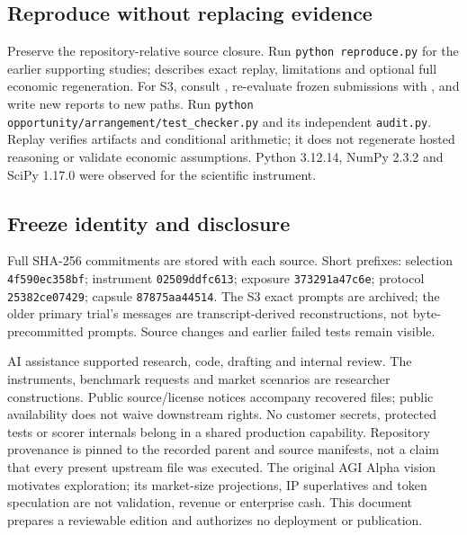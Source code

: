 \documentclass[10pt,letterpaper]{article}
\begin{document}
\subsection*{Reproduce without replacing evidence}
Preserve the repository-relative source closure. Run \texttt{python reproduce.py} for the earlier supporting studies;  describes exact replay, limitations and optional full economic regeneration. For S3, consult , re-evaluate frozen submissions with , and write new reports to new paths. Run \texttt{python opportunity/arrangement/test\_checker.py} and its independent \texttt{audit.py}. Replay verifies artifacts and conditional arithmetic; it does not regenerate hosted reasoning or validate economic assumptions. Python 3.12.14, NumPy 2.3.2 and SciPy 1.17.0 were observed for the scientific instrument.

\subsection*{Freeze identity and disclosure}
Full SHA-256 commitments are stored with each source. Short prefixes: selection \texttt{4f590ec358bf}; instrument \texttt{02509ddfc613}; exposure \texttt{373291a47c6e}; protocol \texttt{25382ce07429}; capsule \texttt{87875aa44514}. The S3 exact prompts are archived; the older primary trial's messages are transcript-derived reconstructions, not byte-precommitted prompts. Source changes and earlier failed tests remain visible.

AI assistance supported research, code, drafting and internal review. The instruments, benchmark requests and market scenarios are researcher constructions. Public source/license notices accompany recovered files; public availability does not waive downstream rights. No customer secrets, protected tests or scorer internals belong in a shared production capability. Repository provenance is pinned to the recorded parent and source manifests, not a claim that every present upstream file was executed. The original AGI Alpha vision motivates exploration; its market-size projections, IP superlatives and token speculation are not validation, revenue or enterprise cash. This document prepares a reviewable edition and authorizes no deployment or publication.
\end{document}
